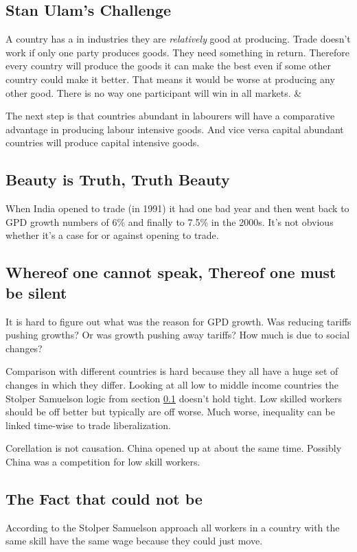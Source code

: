 \documentclass[a4paper, twocolumn]{article}
\newcommand{\keyword}[1]{\textbf{\color{black}{#1}}}
\begin{document}
\subsection{Stan Ulam's Challenge}\label{stolper-samuelson}
A country has a \keyword{Comparative Advantage} in industries they are \emph{relatively} good at producing. Trade doesn't work if only one party produces goods. They need something in return. Therefore every country will produce the goods it can make the best even if some other country could make it better. That means it would be worse at producing any other good. There is no way one participant will win in all markets. \cite{papers-samuelson} \& \cite{political-economy}

The next step is that countries abundant in labourers will have a comparative advantage in producing labour intensive goods. And vice versa capital abundant countries will produce capital intensive goods.\cite{protection-wages}

\subsection{Beauty is Truth, Truth Beauty}
When India opened to trade (in 1991) it had one bad year and then went back to GPD growth numbers of 6\% and finally to 7.5\% in the 2000s. It's not obvious whether it's a case for or against opening to trade.

\subsection{Whereof one cannot speak, Thereof one must be silent}
It is hard to figure out what was the reason for GPD growth. Was reducing tariffs pushing growths? Or was growth pushing away tariffs? How much is due to social changes?

Comparison with different countries is hard because they all have a huge set of changes in which they differ. Looking at all low to middle income countries the Stolper Samuelson logic from section \ref{stolper-samuelson} doesn't hold tight. Low skilled workers should be off better but typically are off worse. Much worse, inequality can be linked time-wise to trade liberalization.

Corellation is not causation. China opened up at about the same time. Possibly China was a competition for low skill workers.

\subsection{The Fact that could not be}
According to the Stolper Samuelson approach all workers in a country with the same skill have the same wage because they could just move.
\end{document}

